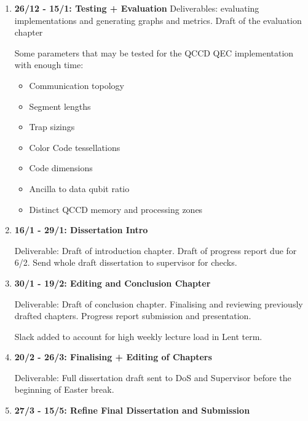 \begin{enumerate}
    \item \textbf{26/12 - 15/1:  Testing + Evaluation}
    Deliverables: evaluating implementations and generating graphs and metrics. Draft of the evaluation chapter
   
    Some parameters that may be tested for the QCCD QEC implementation with enough time:
    \begin{itemize}
        \item Communication topology
        \item Segment lengths
        \item Trap sizings
        \item Color Code tessellations
        \item Code dimensions        
        \item Ancilla to data qubit ratio
        \item Distinct QCCD memory and processing zones
    \end{itemize}

    \item \textbf{16/1 - 29/1: Dissertation Intro}

    Deliverable: Draft of introduction chapter. Draft of progress report due for 6/2. Send whole draft dissertation to supervisor for checks.

    \item \textbf{30/1 - 19/2: Editing and Conclusion Chapter}
    
    Deliverable: Draft of conclusion chapter. Finalising and reviewing previously drafted chapters. Progress report submission and presentation.

    Slack added to account for high weekly lecture load in Lent term.
    
    \item \textbf{20/2 - 26/3: Finalising + Editing of Chapters}

    Deliverable: Full dissertation draft sent to DoS and Supervisor before the beginning of Easter break.
    
    \item \textbf{27/3 - 15/5: Refine Final Dissertation and Submission}
\end{enumerate}


